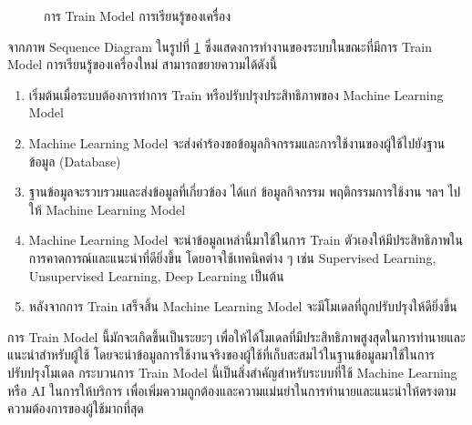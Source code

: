 \documentclass[14pt,oneside,openright,a4paper]{cpe-thai-project}
\begin{document}
  \begin{figure}[!h]\centering
    \setlength{\fboxrule}{0.5mm} %
    \setlength{\fboxsep}{0.5cm}
    \caption{การ Train Model การเรียนรู้ของเครื่อง}\label{fig:Machine learning training}
  \end{figure}
  
  จากภาพ Sequence Diagram ในรูปที่ \ref{fig:Machine learning training} ซึ่งแสดงการทำงานของระบบในขณะที่มีการ Train Model การเรียนรู้ของเครื่องใหม่ สามารถขยายความได้ดังนี้
  \begin{enumerate}
    \item เริ่มต้นเมื่อระบบต้องการทำการ Train หรือปรับปรุงประสิทธิภาพของ Machine Learning Model
    \item Machine Learning Model จะส่งคำร้องขอข้อมูลกิจกรรมและการใช้งานของผู้ใช้ไปยังฐานข้อมูล (Database)
    \item ฐานข้อมูลจะรวบรวมและส่งข้อมูลที่เกี่ยวข้อง ได้แก่ ข้อมูลกิจกรรม พฤติกรรมการใช้งาน ฯลฯ ไปให้ Machine Learning Model
    \item Machine Learning Model จะนำข้อมูลเหล่านี้มาใช้ในการ Train ตัวเองให้มีประสิทธิภาพในการคาดการณ์และแนะนำที่ดียิ่งขึ้น โดยอาจใช้เทคนิคต่าง ๆ เช่น Supervised Learning, Unsupervised Learning, Deep Learning เป็นต้น
    \item หลังจากการ Train เสร็จสิ้น Machine Learning Model จะมีโมเดลที่ถูกปรับปรุงให้ดียิ่งขึ้น
  \end{enumerate}
  การ Train Model นี้มักจะเกิดขึ้นเป็นระยะๆ เพื่อให้ได้โมเดลที่มีประสิทธิภาพสูงสุดในการทำนายและแนะนำสำหรับผู้ใช้ โดยจะนำข้อมูลการใช้งานจริงของผู้ใช้ที่เก็บสะสมไว้ในฐานข้อมูลมาใช้ในการปรับปรุงโมเดล
กระบวนการ Train Model นี้เป็นสิ่งสำคัญสำหรับระบบที่ใช้ Machine Learning หรือ AI ในการให้บริการ เพื่อเพิ่มความถูกต้องและความแม่นยำในการทำนายและแนะนำให้ตรงตามความต้องการของผู้ใช้มากที่สุด
\newpage
\end{document}
